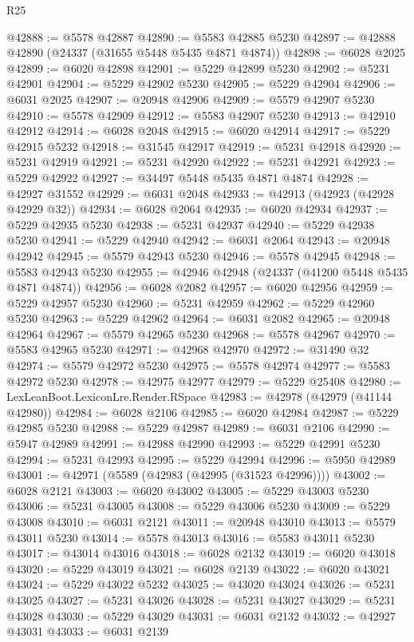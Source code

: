 \begin{lexlean}{R25}
\begin{coremodule}
@42888 := @5578 @42887
@42890 := @5583 @42885 @5230
@42897 := @42888 @42890 (@24337 (@31655 @5448 @5435 @4871 @4874))
@42898 := @6028 @2025
@42899 := @6020 @42898
@42901 := @5229 @42899 @5230
@42902 := @5231 @42901
@42904 := @5229 @42902 @5230
@42905 := @5229 @42904
@42906 := @6031 @2025
@42907 := @20948 @42906
@42909 := @5579 @42907 @5230
@42910 := @5578 @42909
@42912 := @5583 @42907 @5230
@42913 := @42910 @42912
@42914 := @6028 @2048
@42915 := @6020 @42914
@42917 := @5229 @42915 @5232
@42918 := @31545 @42917
@42919 := @5231 @42918
@42920 := @5231 @42919
@42921 := @5231 @42920
@42922 := @5231 @42921
@42923 := @5229 @42922
@42927 := @34497 @5448 @5435 @4871 @4874
@42928 := @42927 @31552
@42929 := @6031 @2048
@42933 := @42913 (@42923 (@42928 @42929 @32))
@42934 := @6028 @2064
@42935 := @6020 @42934
@42937 := @5229 @42935 @5230
@42938 := @5231 @42937
@42940 := @5229 @42938 @5230
@42941 := @5229 @42940
@42942 := @6031 @2064
@42943 := @20948 @42942
@42945 := @5579 @42943 @5230
@42946 := @5578 @42945
@42948 := @5583 @42943 @5230
@42955 := @42946 @42948 (@24337 (@41200 @5448 @5435 @4871 @4874))
@42956 := @6028 @2082
@42957 := @6020 @42956
@42959 := @5229 @42957 @5230
@42960 := @5231 @42959
@42962 := @5229 @42960 @5230
@42963 := @5229 @42962
@42964 := @6031 @2082
@42965 := @20948 @42964
@42967 := @5579 @42965 @5230
@42968 := @5578 @42967
@42970 := @5583 @42965 @5230
@42971 := @42968 @42970
@42972 := @31490 @32
@42974 := @5579 @42972 @5230
@42975 := @5578 @42974
@42977 := @5583 @42972 @5230
@42978 := @42975 @42977
@42979 := @5229 @25408
@42980 := LexLeanBoot.LexiconLre.Render.RSpace
@42983 := @42978 (@42979 (@41144 @42980))
@42984 := @6028 @2106
@42985 := @6020 @42984
@42987 := @5229 @42985 @5230
@42988 := @5229 @42987
@42989 := @6031 @2106
@42990 := @5947 @42989
@42991 := @42988 @42990
@42993 := @5229 @42991 @5230
@42994 := @5231 @42993
@42995 := @5229 @42994
@42996 := @5950 @42989
@43001 := @42971 (@5589 (@42983 (@42995 (@31523 @42996))))
@43002 := @6028 @2121
@43003 := @6020 @43002
@43005 := @5229 @43003 @5230
@43006 := @5231 @43005
@43008 := @5229 @43006 @5230
@43009 := @5229 @43008
@43010 := @6031 @2121
@43011 := @20948 @43010
@43013 := @5579 @43011 @5230
@43014 := @5578 @43013
@43016 := @5583 @43011 @5230
@43017 := @43014 @43016
@43018 := @6028 @2132
@43019 := @6020 @43018
@43020 := @5229 @43019
@43021 := @6028 @2139
@43022 := @6020 @43021
@43024 := @5229 @43022 @5232
@43025 := @43020 @43024
@43026 := @5231 @43025
@43027 := @5231 @43026
@43028 := @5231 @43027
@43029 := @5231 @43028
@43030 := @5229 @43029
@43031 := @6031 @2132
@43032 := @42927 @43031
@43033 := @6031 @2139

\end{coremodule}
\end{lexlean}
